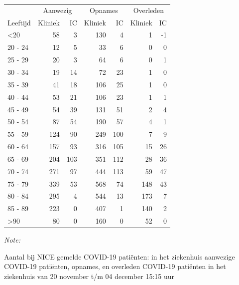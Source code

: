 \documentclass[
  english,
  man,floatsintext]{apa6}
\begin{document}
\begin{table}
\centering\begingroup\fontsize{10}{12}\selectfont

\begin{threeparttable}
\begin{tabular}{lrrrrrr}
\toprule
\multicolumn{1}{c}{ } & \multicolumn{2}{c}{Aanwezig} & \multicolumn{2}{c}{Opnames} & \multicolumn{2}{c}{Overleden} \\
\cmidrule(l{3pt}r{3pt}){2-3} \cmidrule(l{3pt}r{3pt}){4-5} \cmidrule(l{3pt}r{3pt}){6-7}
Leeftijd & Kliniek & IC & Kliniek & IC & Kliniek & IC\\
\midrule
<20 & 58 & 3 & 130 & 4 & 1 & -1\\
20 - 24 & 12 & 5 & 33 & 6 & 0 & 0\\
25 - 29 & 20 & 3 & 64 & 6 & 0 & 1\\
30 - 34 & 19 & 14 & 72 & 23 & 1 & 0\\
35 - 39 & 41 & 18 & 106 & 25 & 1 & 0\\
40 - 44 & 53 & 21 & 106 & 23 & 1 & 1\\
45 - 49 & 54 & 39 & 131 & 51 & 2 & 4\\
50 - 54 & 87 & 54 & 190 & 57 & 4 & 1\\
55 - 59 & 124 & 90 & 249 & 100 & 7 & 9\\
60 - 64 & 157 & 93 & 316 & 105 & 15 & 26\\
65 - 69 & 204 & 103 & 351 & 112 & 28 & 36\\
70 - 74 & 271 & 97 & 444 & 113 & 59 & 47\\
75 - 79 & 339 & 53 & 568 & 74 & 148 & 43\\
80 - 84 & 295 & 4 & 544 & 13 & 173 & 7\\
85 - 89 & 223 & 0 & 407 & 1 & 140 & 2\\
>90 & 80 & 0 & 160 & 0 & 52 & 0\\
\bottomrule
\end{tabular}
\begin{tablenotes}
\item \textit{Note: } 
\item Aantal bij NICE gemelde COVID-19 patiënten: in het ziekenhuis aanwezige COVID-19 patiënten, opnames, en overleden COVID-19 patiënten in het ziekenhuis van 20 november t/m 04 december 15:15 uur
\end{tablenotes}
\end{threeparttable}
\endgroup{}
\end{table}

\newpage
\end{document}
